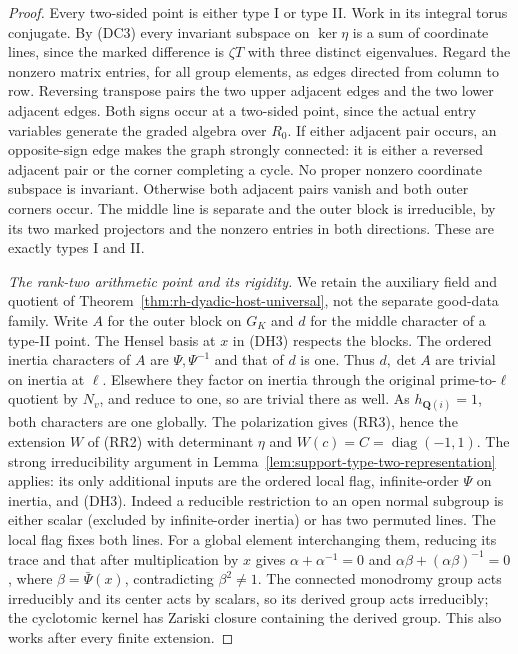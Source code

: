 \begin{proof}
Every two-sided point is either type I or type II. Work in its
integral torus conjugate. By (DC3) every invariant subspace
on $\ker\eta$ is a sum of coordinate lines, since the marked
difference is $\zeta T$ with three distinct eigenvalues.
Regard the nonzero matrix entries, for all group elements,
as edges directed from column to row. Reversing transpose
pairs the two upper adjacent edges and the two lower adjacent
edges. Both signs occur at a two-sided point, since the actual
entry variables generate the graded algebra over $R_0$.
If either adjacent pair occurs, an opposite-sign edge makes
the graph strongly connected: it is either a reversed adjacent
pair or the corner completing a cycle. No proper nonzero
coordinate subspace is invariant. Otherwise both adjacent
pairs vanish and both outer corners occur. The middle line
is separate and the outer block is irreducible, by its
two marked projectors and the nonzero entries in both
directions. These are exactly types I and II.

\emph{The rank-two arithmetic point and its rigidity.}
We retain the auxiliary field and quotient of
Theorem~\ref{thm:rh-dyadic-host-universal}, not the separate
good-data family. Write $A$ for the outer block on $G_K$
and $d$ for the middle character of a type-II point.
The Hensel basis at $x$ in (DH3) respects the blocks.
The ordered inertia characters of $A$ are
$\Psi,\Psi^{-1}$ and that of $d$ is one. Thus
$d,\det A$ are trivial on inertia at $\ell$.
Elsewhere they factor on inertia through the original
prime-to-$\ell$ quotient by $N_v$, and reduce to one,
so are trivial there as well. As $h_{\mathbf Q(i)}=1$,
both characters are one globally. The polarization gives
(RR3), hence the extension $W$ of (RR2) with determinant
$\eta$ and $W(c)=C=\operatorname{diag}(-1,1)$.
The strong irreducibility argument in
Lemma~\ref{lem:support-type-two-representation} applies:
its only additional inputs are the ordered local flag,
infinite-order $\Psi$ on inertia, and (DH3).
Indeed a reducible restriction to an open normal subgroup
is either scalar (excluded by infinite-order inertia)
or has two permuted lines. The local flag fixes both lines.
For a global element interchanging them, reducing its
trace and that after multiplication by $x$ gives
$\alpha+\alpha^{-1}=0$ and
$\alpha\beta+(\alpha\beta)^{-1}=0$, where
$\beta=\bar\Psi(x)$, contradicting $\beta^2\ne1$.
The connected monodromy group acts irreducibly and its
center acts by scalars, so its derived group acts
irreducibly; the cyclotomic kernel has Zariski closure
containing the derived group. This also works after
every finite extension.


\end{proof}
